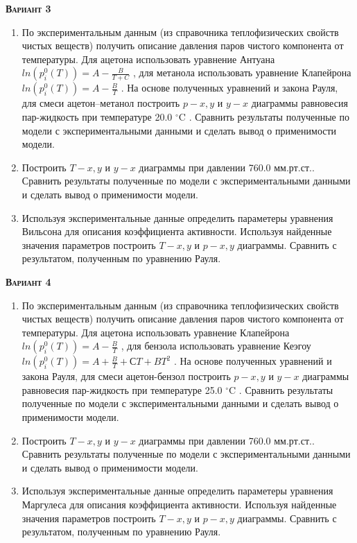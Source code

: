 \textsc{\textbf{Вариант 3}}
\begin{enumerate}
\item По экспериментальным данным (из справочника теплофизических свойств чистых веществ) получить описание давления паров чистого компонента от температуры. Для ацетона использовать уравнение Антуана $ln(p_i^0(T))=A-\frac{B}{T+C}$         , для метанола использовать уравнение Клапейрона $ln(p_i^0(T))=A-\frac{B}{T}$     . На основе полученных уравнений и закона Рауля, для смеси ацетон--метанол построить $p-x,y$ и $y-x$ диаграммы равновесия пар-жидкость при температуре   20.0 $^\circ$C . Сравнить результаты полученные по модели с экспериментальными данными и сделать вывод о применимости модели.

\item Построить $T-x,y$ и $y-x$ диаграммы при давлении  760.0 мм.рт.ст.. Сравнить результаты полученные по модели с экспериментальными данными и сделать вывод о применимости модели. \item Используя экспериментальные данные определить параметеры уравнения Вильсона     для описания коэффициента активности. Используя найденные значения параметров построить $T-x,y$ и $p-x,y$ диаграммы. Сравнить с результатом, полученным по уравнению Рауля.\end{enumerate}

\textsc{\textbf{Вариант 4}}
\begin{enumerate}
\item По экспериментальным данным (из справочника теплофизических свойств чистых веществ) получить описание давления паров чистого компонента от температуры. Для ацетона использовать уравнение Клапейрона $ln(p_i^0(T))=A-\frac{B}{T}$     , для бензола использовать уравнение Кеэгоу $ln(p_i^0(T))=A+\frac{B}{T}+СT+BT^2$    . На основе полученных уравнений и закона Рауля, для смеси ацетон-бензол построить $p-x,y$ и $y-x$ диаграммы равновесия пар-жидкость при температуре   25.0 $^\circ$C . Сравнить результаты полученные по модели с экспериментальными данными и сделать вывод о применимости модели.

\item Построить $T-x,y$ и $y-x$ диаграммы при давлении  760.0 мм.рт.ст.. Сравнить результаты полученные по модели с экспериментальными данными и сделать вывод о применимости модели. \item Используя экспериментальные данные определить параметеры уравнения Маргулеса   для описания коэффициента активности. Используя найденные значения параметров построить $T-x,y$ и $p-x,y$ диаграммы. Сравнить с результатом, полученным по уравнению Рауля.\end{enumerate}

